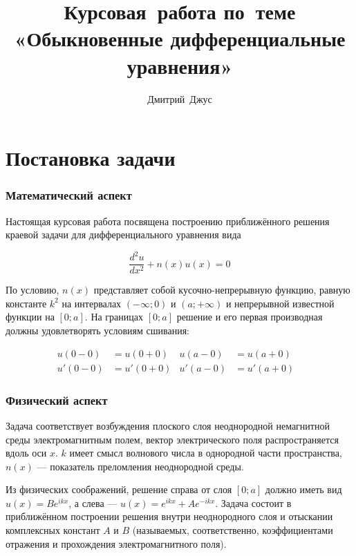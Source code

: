 \documentclass{article}
\numberwithin{equation}{section}
\begin{document}
\author{Дмитрий Джус}
\title{Курсовая работа по теме\\ «Обыкновенные дифференциальные уравнения»}
\maketitle

\newpage

\tableofcontents

\newpage
\part{Постановка задачи}

\section{Математический аспект}

Настоящая курсовая работа посвящена построению приближённого решения
краевой задачи для дифференциального уравнения вида

\begin{equation}\label{deq}
  \frac{d^2 u}{dx^2} + n(x) u(x) = 0
\end{equation}

По условию, $n(x)$ представляет собой кусочно-непрерывную функцию,
равную константе $k^2$ на интервалах $(-\infty; 0)$ и $(a; +\infty)$ и
непрерывной известной функции на $[0; a]$. На границах $[0; a]$
решение и его первая производная должны удовлетворять условиям
сшивания:

\begin{subequations}\label{conds}
  \begin{align}
    u(0-0)& = u(0+0)&
    u(a-0)& = u(a+0)& \\
    u'(0-0)& = u'(0+0)&
    u'(a-0)& = u'(a+0)&
  \end{align}
\end{subequations}

\section{Физический аспект}

Задача соответствует возбуждения плоского слоя неоднородной
немагнитной среды электромагнитным полем, вектор электрического поля
распространяется вдоль оси $x$. $k$ имеет смысл волнового числа в
однородной части пространства, $n(x)$ — показатель преломления
неоднородной среды.

Из физических соображений, решение справа от слоя $[0; a]$ должно
иметь вид $u(x) = Be^{ikx}$, а слева — $u(x) = e^{ikx} +
Ae^{-ikx}$. Задача состоит в приближённом построении решения внутри
неоднородного слоя и отыскании комплексных констант $A$ и $B$
(называемых, соответственно, коэффициентами отражения и прохождения
электромагнитного поля).
\end{document}
